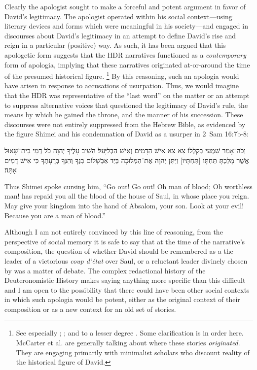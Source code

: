 Clearly the apologist sought to make a forceful and potent argument in favor of David's legitimacy. The apologist operated within his social context---using literary devices and forms which were meaningful in his society---and engaged in discourses about David's legitimacy in an attempt to define David's rise and reign in a particular (positive) way. As such, it has been argued that this apologetic form suggests that the HDR narratives functioned as a \emph{contemporary} form of apologia, implying that these narratives originated at-or-around the time of the presumed historical figure.%
    \footnote{See especially \cite{mccarter_interpretation1981}; \cite{mccarter_jbl1980}; and to a lesser degree \cite[75--76]{halpern2001}. Some clarification is in order here. McCarter et al. are generally talking about where these stories \emph{originated}. They are engaging primarily with minimalist scholars who discount reality of the historical figure of David.}
By this reasoning, such an apologia would have arisen in response to accusations of usurpation. Thus, we would imagine that the HDR was representative of the ``last word'' on the matter or an attempt to suppress alternative voices that questioned the legitimacy of David's rule, the means by which he gained the throne, and the manner of his succession. These discourses were not entirely suppressed from the Hebrew Bible, as evidenced by the figure Shimei and his condemnation of David as a usurper in 2~Sam 16:7b-8:
\begin{hebrewtext}
    וְכֹה־אָמַר שִׁמְעִי בְּקַלְלוֹ צֵא צֵא אִישׁ הַדָּמִים וְאִישׁ הַבְּלִיָּעַל׃ 
    הֵשִׁיב עָלֶיךָ יְהוָה כֹּל דְּמֵי בֵית־שָׁאוּל אֲשֶׁר מָלַכְתָּ תַּחְתָּו [תַּחְתָּיו] וַיִּתֵּן יְהוָה אֶת־הַמְּלוּכָה בְּיַד אַבְשָׁלוֹם בְּנֶךָ וְהִנְּךָ בְּרָעָתֶךָ כִּי אִישׁ דָּמִים אָתָּה׃
\end{hebrewtext}
\begin{translation}
    Thus Shimei spoke cursing him, ``Go out! Go out! Oh man of blood; Oh worthless man! \yahweh has repaid you all the blood of the house of Saul, in whose place you reign. May \yahweh give your kingdom into the hand of Absalom, your son. Look at your evil! Because you are a man of blood.''
\end{translation}
\noindent
Although I am not entirely convinced by this line of reasoning, from the perspective of social memory it is safe to say that at the time of the narrative's composition, the question of whether David should be remembered as a the leader of a victorious \emph{coup d'état} over Saul, or a reluctant leader divinely chosen by \yahweh was a matter of debate. The complex redactional history of the Deuteronomistic History makes saying anything more specific than this difficult and I am open to the possibility that there could have been other social contexts in which such apologia would be potent, either as the original context of their composition or as a new context for an old set of stories.%
